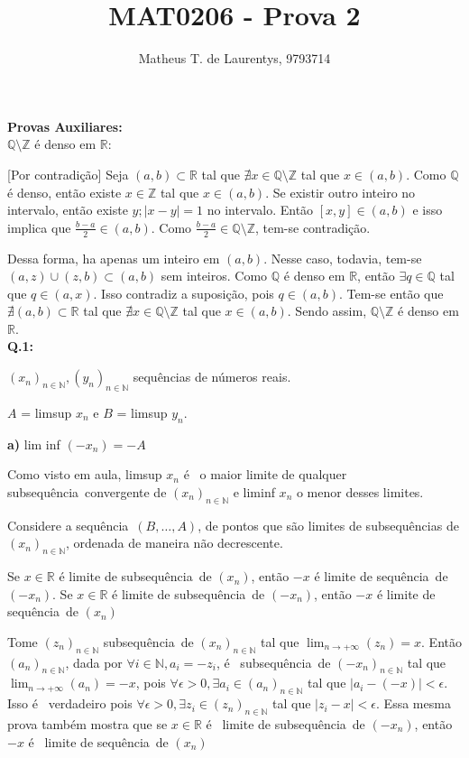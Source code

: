\documentclass[12pt,twoside]{article}
\title{MAT0206 - Prova 2}
\author{Matheus T. de Laurentys, 9793714}
\newcommand{\n}{não }
\newcommand{\ent}{então }
\newcommand{\Ent}{Então }
\newcommand{\eh}{é }
\newcommand{\seq}{sequência}
\newcommand{\num}{número}
\newcommand{\sao}{são }
\newcommand{\tambem}{também }
\newcommand{\contradicao}{contradição}
\newcommand{\limi}[2]{$\displaystyle{\lim_{n \to +\infty}}(#1)=#2$}
\newcommand{\R}{\mathbb{R}}
\newcommand{\N}{\mathbb{N}}
\begin{document}
	\maketitle
	
	\noindent\textbf{Provas Auxiliares:}\\
	
	$\mathbb{Q}\setminus\mathbb{Z}$ \eh denso em $\R$:
	
	[Por \contradicao] Seja $(a,b) \subset \R$ tal que $\nexists x \in \mathbb{Q}\setminus\mathbb{Z}$ tal que $x \in (a,b)$.
	Como $\mathbb{Q}$ \eh denso, \ent existe $x\in \mathbb{Z}$ tal que $x\in (a,b)$. Se existir outro inteiro no intervalo, \ent existe $y; |x-y| = 1$ no intervalo. \Ent $[x,y] \in (a,b)$ e isso implica que $\frac{b-a}{2} \in (a,b)$. Como $\frac{b-a}{2} \in \mathbb{Q}\setminus\mathbb{Z}$, tem-se \contradicao.
	
	Dessa forma, ha apenas um inteiro em $(a,b)$. Nesse caso, todavia, tem-se $(a,z)\cup (z,b) \subset (a,b)$ sem inteiros. Como $\mathbb{Q}$ \eh denso em $\R$, \ent $\exists q \in \mathbb{Q}$ tal que $q \in (a,x)$. Isso contradiz a suposição, pois $q \in (a,b)$. Tem-se \ent que $\nexists(a,b) \subset \R$ tal que $\nexists x \in \mathbb{Q}\setminus\mathbb{Z}$ tal que $x \in (a,b)$. Sendo assim, $\mathbb{Q}\setminus\mathbb{Z}$ \eh denso em $\R$.\\
	
		
	\noindent\textbf{Q.1:}
	
	$(x_n)_{n\in\mathbb{N}}, (y_n)_{n\in\mathbb{N}}$ \seq s de \num s reais.
	
	$A$ = limsup $x_n$ e $B$ = limsup $y_n$.
	
	\noindent\textbf{a)} lim inf $(-x_n) = - A$
	
	Como visto em aula, limsup $x_n$ \eh\ o maior limite de qualquer sub\seq\ convergente de $(x_n)_{n\in\N}$ e liminf $x_n$ o menor desses limites.
	
	Considere a \seq\ $(B, \ldots, A)$, de pontos que \sao limites de sub\seq s de $(x_n)_{n\in\mathbb{N}}$,  ordenada de maneira \n decrescente.
	
	Se $x\in\mathbb{R}$ \eh limite de sub\seq\ de $(x_n)$, \ent $-x$ \eh limite de \seq\ de $(-x_n)$. Se $x\in\mathbb{R}$ \eh limite de sub\seq\ de $(-x_n)$, \ent $-x$ \eh limite de \seq\ de $(x_n)$
	
	\noindent [Prova] Tome $(z_n)_{n\in\mathbb{N}}$ sub\seq\ de $(x_n)_{n\in\mathbb{N}}$ tal que \limi{z_n}{x}. 
	\Ent $(a_n)_{n\in\mathbb{N}}$, dada por $\forall i\in\mathbb{N}, a_i = -z_i$, \eh\ sub\seq\ de $(-x_n)_{n\in\mathbb{N}}$ tal que \limi{a_n}{-x}, pois $\forall \epsilon > 0, \exists a_i \in (a_n)_{n\in\mathbb{N}}$ tal que $|a_i - (-x)| < \epsilon$. Isso \eh\ verdadeiro pois $\forall \epsilon > 0, \exists z_i \in (z_n)_{n\in\mathbb{N}}$ tal que $|z_i -  x| < \epsilon$. Essa mesma prova \tambem mostra que se $x\in\mathbb{R}$ \eh\ limite de sub\seq\ de $(-x_n)$, \ent $-x$ \eh\ limite de \seq\ de $(x_n)$
	
\end{document}
